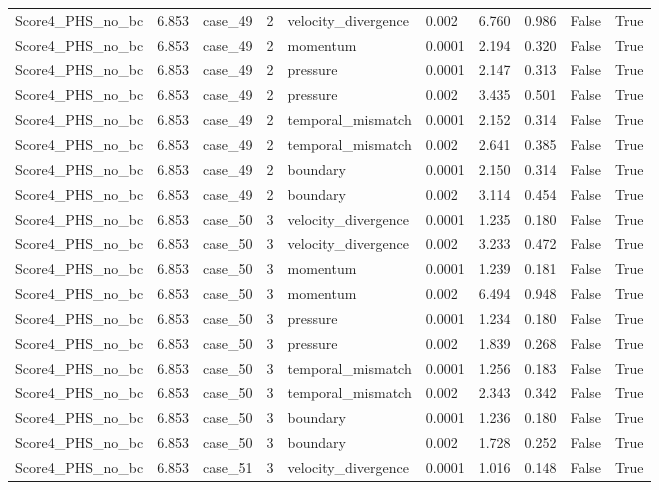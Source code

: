 \begin{longtable}{llllllllll}
Score4\_PHS\_no\_bc & 6.853 & case\_49 & 2 & velocity\_divergence & 0.002 & 6.760 & 0.986 & False & True \\
Score4\_PHS\_no\_bc & 6.853 & case\_49 & 2 & momentum & 0.0001 & 2.194 & 0.320 & False & True \\
Score4\_PHS\_no\_bc & 6.853 & case\_49 & 2 & pressure & 0.0001 & 2.147 & 0.313 & False & True \\
Score4\_PHS\_no\_bc & 6.853 & case\_49 & 2 & pressure & 0.002 & 3.435 & 0.501 & False & True \\
Score4\_PHS\_no\_bc & 6.853 & case\_49 & 2 & temporal\_mismatch & 0.0001 & 2.152 & 0.314 & False & True \\
Score4\_PHS\_no\_bc & 6.853 & case\_49 & 2 & temporal\_mismatch & 0.002 & 2.641 & 0.385 & False & True \\
Score4\_PHS\_no\_bc & 6.853 & case\_49 & 2 & boundary & 0.0001 & 2.150 & 0.314 & False & True \\
Score4\_PHS\_no\_bc & 6.853 & case\_49 & 2 & boundary & 0.002 & 3.114 & 0.454 & False & True \\
Score4\_PHS\_no\_bc & 6.853 & case\_50 & 3 & velocity\_divergence & 0.0001 & 1.235 & 0.180 & False & True \\
Score4\_PHS\_no\_bc & 6.853 & case\_50 & 3 & velocity\_divergence & 0.002 & 3.233 & 0.472 & False & True \\
Score4\_PHS\_no\_bc & 6.853 & case\_50 & 3 & momentum & 0.0001 & 1.239 & 0.181 & False & True \\
Score4\_PHS\_no\_bc & 6.853 & case\_50 & 3 & momentum & 0.002 & 6.494 & 0.948 & False & True \\
Score4\_PHS\_no\_bc & 6.853 & case\_50 & 3 & pressure & 0.0001 & 1.234 & 0.180 & False & True \\
Score4\_PHS\_no\_bc & 6.853 & case\_50 & 3 & pressure & 0.002 & 1.839 & 0.268 & False & True \\
Score4\_PHS\_no\_bc & 6.853 & case\_50 & 3 & temporal\_mismatch & 0.0001 & 1.256 & 0.183 & False & True \\
Score4\_PHS\_no\_bc & 6.853 & case\_50 & 3 & temporal\_mismatch & 0.002 & 2.343 & 0.342 & False & True \\
Score4\_PHS\_no\_bc & 6.853 & case\_50 & 3 & boundary & 0.0001 & 1.236 & 0.180 & False & True \\
Score4\_PHS\_no\_bc & 6.853 & case\_50 & 3 & boundary & 0.002 & 1.728 & 0.252 & False & True \\
Score4\_PHS\_no\_bc & 6.853 & case\_51 & 3 & velocity\_divergence & 0.0001 & 1.016 & 0.148 & False & True \\

\end{longtable}
